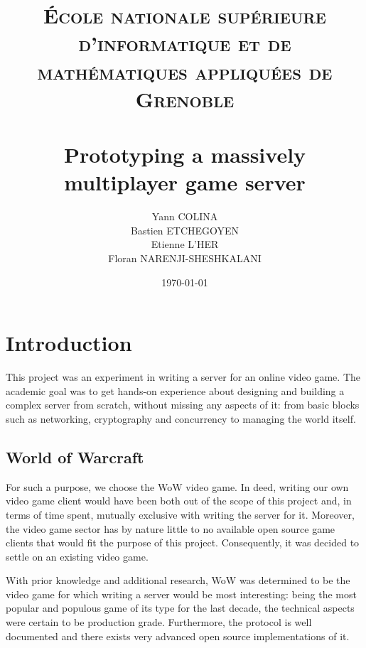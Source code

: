 \documentclass[paper=a4, fontsize=11pt]{scrartcl}
\title{%
    \normalfont{}
    \normalsize{}
    \textsc{École nationale supérieure d'informatique et de mathématiques appliquées de Grenoble} \\ [10pt]
    \horrule{0.5pt} \\[0.4cm]
    \huge Prototyping a massively multiplayer game server
    \horrule{2pt} \\[0.5cm]
}
\author{Yann COLINA\\
Bastien ETCHEGOYEN\\
Etienne L'HER\\
Floran NARENJI-SHESHKALANI}
\date{\normalsize\today}
\begin{document}
\maketitle

\iffalse{}
* Reflection
* Actor system/hierarchy
* API
* Diagrams
    * Actors hierarchy/messages
    * Client protocol
* Protocol (scodec)
* Handlers
* AuthServer
    * SRP6a
* WorldServer
    * RC4a
    * Actor interactions (EventStream)
* Reverse engineering difficulties
    * Big protocol, organicly built, too many features
* Sources
    * TrinityCore
    * Akka docs
    * Scala docs
    * scodec
* Scala
    * Functional
    * Immutable
    * Preferred language for Akka actors (ugly in Java)
    * Strongly typed
    * Full of syntaxic sugar
    * Ahead of it's time ('research language')
    * Home grown language (der Schweiz)

\fi

\section{Introduction}

This project was an experiment in writing a server for an online
video game.
The academic goal was to get hands-on experience about designing and building a
complex server from scratch, without missing any aspects of it: from basic blocks
such as networking, cryptography and concurrency to managing the world itself.

\subsection{World of Warcraft}

For such a purpose, we choose the \gls{WoW} video game.
In deed, writing our own video game client would have been both out of the scope
of this project and, in terms of time spent, mutually exclusive with writing the
server for it.
Moreover, the video game sector has by nature little to no available open source
game clients that would fit the purpose of this project.
Consequently, it was decided to settle on an existing video game.

With prior knowledge and additional research, \gls{WoW} was determined to be the
video game for which writing a server would be most interesting: being the most
popular and populous game of its type for the last decade, the technical aspects
were certain to be production grade. Furthermore, the protocol is well
documented and there exists very advanced open source implementations of it.
\end{document}
